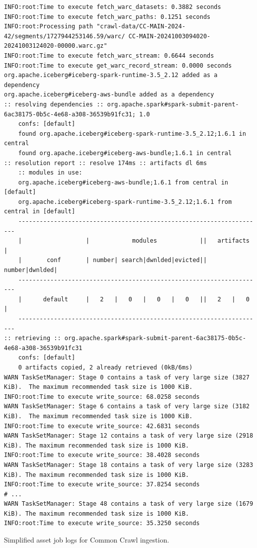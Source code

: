 \begin{listing}[H]
\begin{verbatim}
INFO:root:Time to execute fetch_warc_datasets: 0.3882 seconds
INFO:root:Time to execute fetch_warc_paths: 0.1251 seconds
INFO:root:Processing path "crawl-data/CC-MAIN-2024-42/segments/1727944253146.59/warc/ CC-MAIN-20241003094020-20241003124020-00000.warc.gz"
INFO:root:Time to execute fetch_warc_stream: 0.6644 seconds
INFO:root:Time to execute get_warc_record_stream: 0.0000 seconds
org.apache.iceberg#iceberg-spark-runtime-3.5_2.12 added as a dependency
org.apache.iceberg#iceberg-aws-bundle added as a dependency
:: resolving dependencies :: org.apache.spark#spark-submit-parent-6ac38175-0b5c-4e68-a308-36539b91fc31; 1.0
    confs: [default]
    found org.apache.iceberg#iceberg-spark-runtime-3.5_2.12;1.6.1 in central
    found org.apache.iceberg#iceberg-aws-bundle;1.6.1 in central
:: resolution report :: resolve 174ms :: artifacts dl 6ms
    :: modules in use:
    org.apache.iceberg#iceberg-aws-bundle;1.6.1 from central in [default]
    org.apache.iceberg#iceberg-spark-runtime-3.5_2.12;1.6.1 from central in [default]
    ---------------------------------------------------------------------
    |                  |            modules            ||   artifacts   |
    |       conf       | number| search|dwnlded|evicted|| number|dwnlded|
    ---------------------------------------------------------------------
    |      default     |   2   |   0   |   0   |   0   ||   2   |   0   |
    ---------------------------------------------------------------------
:: retrieving :: org.apache.spark#spark-submit-parent-6ac38175-0b5c-4e68-a308-36539b91fc31
    confs: [default]
    0 artifacts copied, 2 already retrieved (0kB/6ms)
WARN TaskSetManager: Stage 0 contains a task of very large size (3827 KiB).  The maximum recommended task size is 1000 KiB.
INFO:root:Time to execute write_source: 68.0258 seconds
WARN TaskSetManager: Stage 6 contains a task of very large size (3182 KiB).  The maximum recommended task size is 1000 KiB.
INFO:root:Time to execute write_source: 42.6831 seconds
WARN TaskSetManager: Stage 12 contains a task of very large size (2918 KiB). The maximum recommended task size is 1000 KiB.
INFO:root:Time to execute write_source: 38.4028 seconds
WARN TaskSetManager: Stage 18 contains a task of very large size (3283 KiB). The maximum recommended task size is 1000 KiB.
INFO:root:Time to execute write_source: 37.8254 seconds
# ...
WARN TaskSetManager: Stage 48 contains a task of very large size (1679 KiB). The maximum recommended task size is 1000 KiB.
INFO:root:Time to execute write_source: 35.3250 seconds
\end{verbatim}
\caption{Simplified asset job logs for Common Crawl ingestion.}
\label{lst:appendix-listings-spark-logs}
\end{listing}


